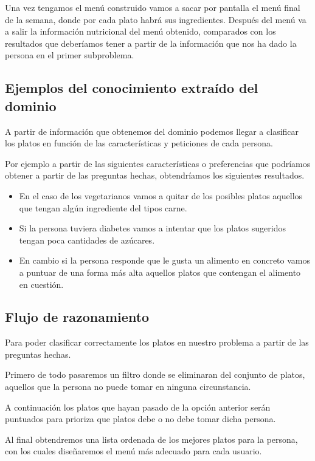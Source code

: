 \documentclass[12]{article}
\begin{document}
Una vez tengamos el menú construido vamos a sacar por pantalla el menú final de la semana, donde por cada plato habrá sus ingredientes.
Después del menú va a salir la información nutricional del menú obtenido, comparados con los resultados que deberíamos tener a partir de la información que nos ha dado la persona en el primer subproblema.

\subsection{Ejemplos del conocimiento extraído del dominio}
A partir de información que obtenemos del dominio podemos llegar a clasificar los platos en función de las características y peticiones de cada persona.

Por ejemplo a partir de las siguientes características o preferencias que podríamos obtener a partir de las preguntas hechas, obtendríamos los siguientes resultados.

\begin{itemize}
	\item En el caso de los vegetarianos vamos a quitar de los posibles platos aquellos que tengan algún ingrediente del tipos carne.
	\item Si la persona tuviera diabetes vamos a intentar que los platos sugeridos tengan poca cantidades de azúcares.
	\item En cambio si la persona responde que le gusta un alimento en concreto vamos a puntuar de una forma más alta aquellos platos que contengan el alimento en cuestión.
\end{itemize}

\subsection{Flujo de razonamiento}

Para poder clasificar correctamente los platos en nuestro problema a partir de las preguntas hechas.

Primero de todo pasaremos un filtro donde se eliminaran del conjunto de platos, aquellos que la persona no puede tomar en ninguna circunstancia.

A continuación los platos que hayan pasado de la opción anterior serán puntuados para prioriza que platos debe o no debe tomar dicha persona.

Al final obtendremos una lista ordenada de los mejores platos para la persona, con los cuales diseñaremos el menú más adecuado para cada usuario. 
\end{document}
